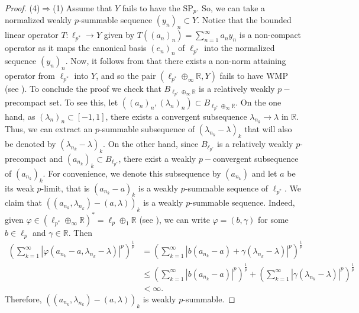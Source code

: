 \documentclass[12 pt]{article}%
\newtheorem{final remark}[theorem]{Final Remark}
\newcommand {\R}{\mathbb{R}}
\begin{document}
\begin{proof}
(4)$\Rightarrow$(1) Assume that $Y$ fails to have the $\mathrm{SP}_p$. So, we can take a normalized weakly $p$-summable sequence $(y_n)_n \subset Y$. Notice that the bounded linear operator    $T: \ell_{p^{*}} \to Y$ given by $T((a_{n})_{n})=\displaystyle \sum\limits_{n=1}^{\infty} a_{n}y_{n}$ is a non-compact operator as it maps the canonical basis $(e_n)_n$ of $\ell_{p^*}$ into the normalized sequence $(y_n)_n$. Now, it follows from \cite[Theorem B]{sheldon} that there exists a non-norm attaining operator from $\ell_{p^*}$ into $Y$, and so the pair $(\ell_{p^{*}}\oplus_{\infty}\mathbb{R},Y)$ fails to have $\mathrm{WMP}$ (see \cite[Main Theorem(b)]{dantasjung}). %
To conclude the proof we check that $B_{\ell_{p^{*}}\oplus_{\infty}\mathbb{R}}$ is a relatively weakly $p-$precompact set. To see this, let $((a_{n})_{n},(\lambda_{n})_{n})\subset B_{\ell_{p^{*}}\oplus_{\infty}\R}$. On the one hand, as $(\lambda_{n})_n \subset[-1,1]$, there exists a convergent subsequence $\lambda_{n_k} \to \lambda$ in $\R$. Thus, we can extract an $p$-summable subsequence of $(\lambda_{n_{k}}-\lambda)_{k}$ that will also be denoted by $(\lambda_{n_{k}}-\lambda)_{k}$. On the other hand, since $B_{\ell_{p^*}}$ is a relatively weakly $p$-precompact and $(a_{n_k})_k \subset B_{\ell_{p^{*}}}$, there exist a weakly $p-$convergent subsequence of $(a_{n_{k}})_k$. For convenience, we denote this subsequence by  $(a_{n_{k}})$ and let $a$ be its weak $p$-limit, that is $(a_{n_k} - a)_k$ is a weakly $p$-summable sequence of $\ell_{p^*}$. We claim that $((a_{n_k}, \lambda_{n_{k}}) - (a, \lambda))_k$ is a weakly $p$-summable sequence.    Indeed, given $\varphi \in (\ell_{p^{*}}\oplus_{\infty} \mathbb{R})^{*} = \ell_{p}\oplus_{1}\mathbb{R}$ (see \cite[Exercise 4.5.13]{geraldo}), we can write $\varphi = (b,\gamma)$ for some $b \in \ell_{p}$ and $\gamma \in \mathbb{R}$. Then \begin{align*}        \left(\sum_{k=1}^{\infty}|\varphi(a_{n_{k}}-a,\lambda_{n_{k}}-\lambda)|^{p}\right)^{\frac{1}{p}}            &=\left(\sum_{k=1}^{\infty}|b(a_{n_{k}}-a) + \gamma(\lambda_{n_{k}}-\lambda)|^{p}\right)^{\frac{1}{p}} \\             &\leq\left( \sum_{k=1}^{\infty}|b(a_{n_{k}}-a)|^{p}\right)^{\frac{1}{p}} + \left(\sum_{k=1}^{\infty}|\gamma(\lambda_{n_{k}}-\lambda)|^{p}\right)^{\frac{1}{p}} \\            &< \infty.    \end{align*}    Therefore, \(((a_{n_k},\lambda_{n_k}) - (a,\lambda))_k\) is weakly \(p\)-summable. 
\end{proof}
\end{document}
